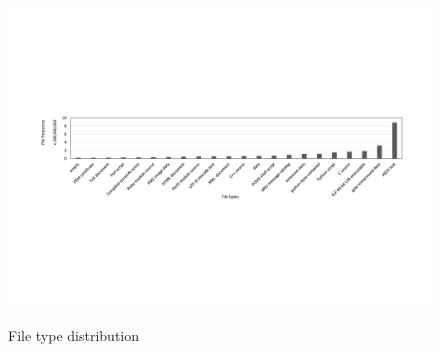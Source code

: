 \begin{figure}
	\centering
	\includegraphics[width=1\textwidth]{graphs/file_type.pdf}\\
	\caption{File type distribution}\label{fig-file-type}
\end{figure}

